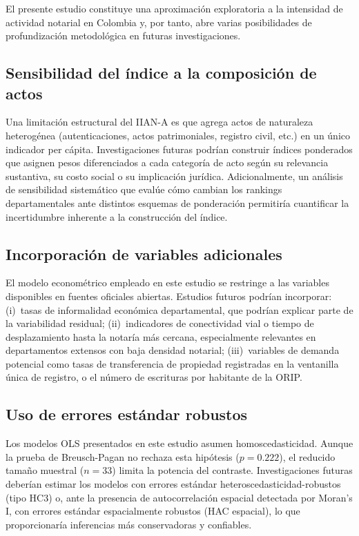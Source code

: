 \documentclass{article}
\begin{document}
El presente estudio constituye una aproximación exploratoria a la
intensidad de actividad notarial en Colombia y, por tanto, abre
varias posibilidades de profundización metodológica en futuras
investigaciones.

\subsection{Sensibilidad del índice a la composición de actos}

Una limitación estructural del IIAN-A es que agrega actos de
naturaleza heterogénea (autenticaciones, actos patrimoniales,
registro civil, etc.) en un único indicador per cápita. Investigaciones
futuras podrían construir índices ponderados que asignen pesos
diferenciados a cada categoría de acto según su relevancia sustantiva,
su costo social o su implicación jurídica. Adicionalmente, un análisis
de sensibilidad sistemático que evalúe cómo cambian los rankings
departamentales ante distintos esquemas de ponderación permitiría
cuantificar la incertidumbre inherente a la construcción del índice.

\subsection{Incorporación de variables adicionales}

El modelo econométrico empleado en este estudio se restringe a las
variables disponibles en fuentes oficiales abiertas. Estudios futuros
podrían incorporar: (i)~tasas de informalidad económica departamental,
que podrían explicar parte de la variabilidad residual; (ii)~indicadores
de conectividad vial o tiempo de desplazamiento hasta la notaría más
cercana, especialmente relevantes en departamentos extensos con baja
densidad notarial; (iii)~variables de demanda potencial como tasas de
transferencia de propiedad registradas en la ventanilla única de
registro, o el número de escrituras por habitante de la ORIP.

\subsection{Uso de errores estándar robustos}

Los modelos OLS presentados en este estudio asumen homoscedasticidad.
Aunque la prueba de Breusch-Pagan no rechaza esta hipótesis
($p = 0.222$), el reducido tamaño muestral ($n = 33$) limita la
potencia del contraste. Investigaciones futuras deberían estimar los
modelos con errores estándar heteroscedasticidad-robustos
(tipo HC3) o, ante la presencia de autocorrelación espacial detectada
por Moran's I, con errores estándar espacialmente robustos (HAC
espacial), lo que proporcionaría inferencias más conservadoras y
confiables.
\end{document}
